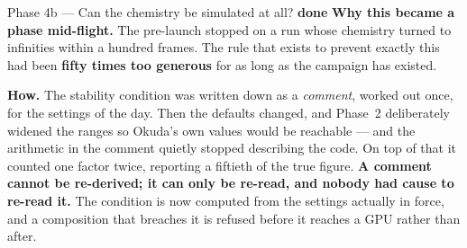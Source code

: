 \documentclass[11pt,a4paper]{article}
\newcommand{\dn}{\textcolor{good}{\textbf{done}}}
\begin{document}
\begin{phasebox}{Phase 4b --- Can the chemistry be simulated at all? \hfill \dn}
\textbf{Why this became a phase mid-flight.} The pre-launch stopped on a run whose chemistry turned
to infinities within a hundred frames. The rule that exists to prevent exactly this had been
\textbf{fifty times too generous} for as long as the campaign has existed.

\textbf{How.} The stability condition was written down as a \emph{comment}, worked out once, for the
settings of the day. Then the defaults changed, and Phase~2 deliberately widened the ranges so
Okuda's own values would be reachable --- and the arithmetic in the comment quietly stopped
describing the code. On top of that it counted one factor twice, reporting a fiftieth of the true
figure. \textbf{A comment cannot be re-derived; it can only be re-read, and nobody had cause to
re-read it.} The condition is now computed from the settings actually in force, and a composition
that breaches it is refused before it reaches a GPU rather than after.
\end{phasebox}
\end{document}
